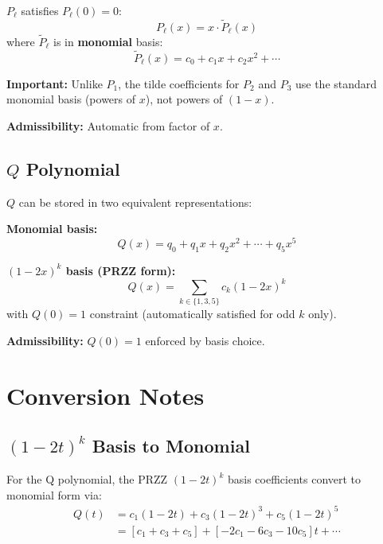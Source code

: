 \documentclass[11pt]{article}
\begin{document}
$P_\ell$ satisfies $P_\ell(0) = 0$:
\begin{equation}
P_\ell(x) = x \cdot \tilde{P}_\ell(x)
\end{equation}
where $\tilde{P}_\ell$ is in \textbf{monomial} basis:
\begin{equation}
\tilde{P}_\ell(x) = c_0 + c_1 x + c_2 x^2 + \cdots
\end{equation}

\textbf{Important:} Unlike $P_1$, the tilde coefficients for $P_2$ and $P_3$ use the standard monomial basis (powers of $x$), not powers of $(1-x)$.

\textbf{Admissibility:} Automatic from factor of $x$.

\subsection{$Q$ Polynomial}

$Q$ can be stored in two equivalent representations:

\textbf{Monomial basis:}
\begin{equation}
Q(x) = q_0 + q_1 x + q_2 x^2 + \cdots + q_5 x^5
\end{equation}

\textbf{$(1-2x)^k$ basis (PRZZ form):}
\begin{equation}
Q(x) = \sum_{k \in \{1,3,5\}} c_k (1-2x)^k
\end{equation}
with $Q(0) = 1$ constraint (automatically satisfied for odd $k$ only).

\textbf{Admissibility:} $Q(0) = 1$ enforced by basis choice.

\section{Conversion Notes}

\subsection{$(1-2t)^k$ Basis to Monomial}

For the Q polynomial, the PRZZ $(1-2t)^k$ basis coefficients convert to monomial form via:
\begin{align*}
Q(t) &= c_1(1-2t) + c_3(1-2t)^3 + c_5(1-2t)^5 \\
     &= [c_1 + c_3 + c_5] + [-2c_1 - 6c_3 - 10c_5]t + \cdots
\end{align*}
\end{document}
